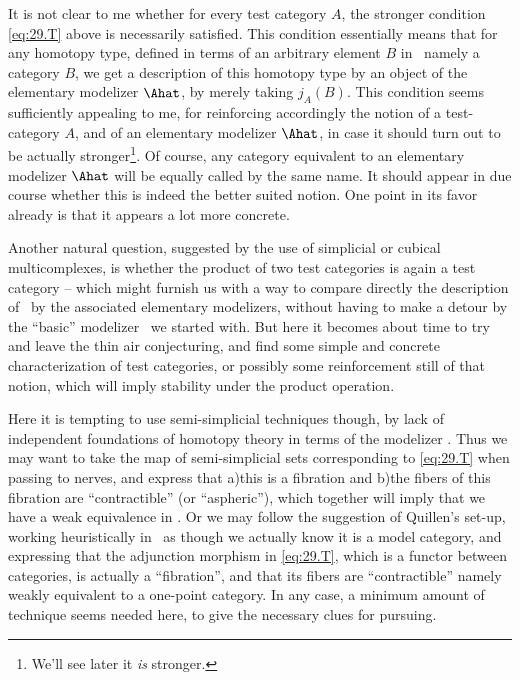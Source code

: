 It is not clear to me whether for every test category $A$, the
stronger condition \eqref{eq:29.T} above is necessarily
satisfied. This condition essentially means that for any homotopy
type, defined in terms of an arbitrary element $B$ in \Cat\ namely a
category $B$, we get a description of this homotopy type by an object
of the elementary modelizer $\Ahat$, by merely taking
$j_A(B)$. This condition seems sufficiently appealing to me, for
reinforcing accordingly the notion of a test-category $A$, and of an
elementary modelizer $\Ahat$, in case it should turn out to be
actually stronger\footnote{We'll see later it \emph{is} stronger.}. Of course, any category equivalent to an elementary
modelizer $\Ahat$ will be equally called by the same name. It
should appear in due course whether this is indeed the better suited
notion. One point in its favor already is that it appears a lot more
concrete.

Another natural question, suggested by the use of simplicial or
cubical multicomplexes, is whether the product of two test categories
is again a test category -- which might furnish us with a way to
compare directly the description of \Hot\ by the associated elementary
modelizers, without having to make a detour by the
``basic'' modelizer \Cat\ we started with. But here it becomes about
time to try and leave the thin air conjecturing, and find some simple
and concrete characterization of test categories, or possibly some
reinforcement still of that notion, which will imply stability under
the product operation.

Here it is tempting to use semi-simplicial techniques though, by lack
of independent foundations of homotopy theory in terms of the
modelizer \Cat. Thus we may want to take the map of semi-simplicial
sets corresponding to \eqref{eq:29.T} when passing to nerves, and
express that a)\enspace this is a fibration and b)\enspace the fibers
of this fibration are ``contractible'' (or ``aspheric''), which
together will imply that we have a weak equivalence in \Sssets. Or we
may follow the suggestion of Quillen's set-up, working heuristically
in \Cat\ as though we actually know it is a model category, and
expressing that the adjunction morphism in \eqref{eq:29.T}, which is a
functor between categories, is actually a ``fibration'', and that its
fibers are ``contractible'' namely weakly equivalent to a one-point
category. In any case, a minimum amount of technique seems needed
here, to give the necessary clues for pursuing.

\bigbreak
\presectionfill{}\par

